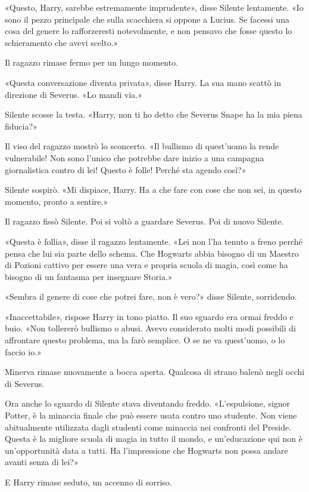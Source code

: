 «Questo, Harry, sarebbe estremamente imprudente», disse Silente lentamente. «Io sono il pezzo principale che sulla scacchiera si oppone a Lucius. Se facessi una cosa del genere lo rafforzeresti notevolmente, e non pensavo che fosse questo lo schieramento che avevi scelto.»

Il ragazzo rimase fermo per un lungo momento.

«Questa conversazione diventa privata», disse Harry. La sua mano scattò in direzione di Severus. «Lo mandi via.»

Silente scosse la testa. «Harry, non ti ho detto che Severus Snape ha la mia piena fiducia?»

Il viso del ragazzo mostrò lo sconcerto. «Il bullismo di quest’uomo la rende vulnerabile! Non sono l’unico che potrebbe dare inizio a una campagna giornalistica contro di lei! Questo è folle! Perché sta agendo così?»

Silente sospirò. «Mi dispiace, Harry. Ha a che fare con cose che non sei, in questo momento, pronto a sentire.»

Il ragazzo fissò Silente. Poi si voltò a guardare Severus. Poi di nuovo Silente.

«Questa è follia», disse il ragazzo lentamente. «Lei non l’ha tenuto a freno perché pensa che lui sia parte dello schema. Che Hogwarts abbia bisogno di un Maestro di Pozioni cattivo per essere una vera e propria scuola di magia, così come ha bisogno di un fantasma per insegnare Storia.»

«Sembra il genere di cose che potrei fare, non è vero?» disse Silente, sorridendo.

«Inaccettabile», rispose Harry in tono piatto. Il suo sguardo era ormai freddo e buio. «Non tollererò bullismo o abusi. Avevo considerato molti modi possibili di affrontare questo problema, ma la farò semplice. O se ne va quest’uomo, o lo faccio io.»

Minerva rimase nuovamente a bocca aperta. Qualcosa di strano balenò negli occhi di Severus.

Ora anche lo sguardo di Silente stava diventando freddo. «L’espulsione, signor Potter, è la minaccia finale che può essere usata contro uno studente. Non viene abitualmente utilizzata dagli studenti come minaccia nei confronti del Preside. Questa è la migliore scuola di magia in tutto il mondo, e un’educazione qui non è un’opportunità data a tutti. Ha l’impressione che Hogwarts non possa andare avanti senza di lei?»

E Harry rimase seduto, un accenno di sorriso.

